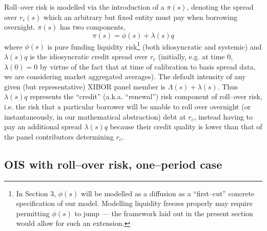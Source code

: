 \documentclass[12pt,a4paper]{article}
\theoremstyle{plain}
\numberwithin{equation}{section}
\begin{document}
Roll--over risk is modelled via the introduction of a $\pi(s)$, denoting the spread over $r_c(s)$ which an arbitrary but fixed entity must pay when borrowing overnight. $\pi(s)$ has two components,
\begin{equation}
\pi(s)=\phi(s)+\lambda(s)q
\end{equation}
where $\phi(s)$ is pure funding liquidity risk\footnote{In Section 3, $\phi(s)$ will be modelled as a diffusion as a ``first--cut'' concrete specification of our model. Modelling liquidity freezes properly may require permitting $\phi(s)$ to jump --- the framework laid out in the present section would allow for such an extension.} (both idiosyncratic and systemic) and $\lambda(s)q$ is the idiosyncratic credit spread over $r_c$ (initially, e.g. at time 0, $\lambda(0)=0$ by virtue of the fact that at time of calibration to basis spread data, we are considering market aggregated averages). The default intensity of any given (but representative) XIBOR panel member is $\Lambda(s)+\lambda(s)$. Thus $\lambda(s)q$ represents the ``credit'' (a.k.a. ``renewal'') risk component of roll--over risk, i.e. the risk that a particular borrower will be unable to roll over overnight (or instantaneously, in our mathematical abstraction) debt at $r_c$, instead having to pay an additional spread $\lambda(s)q$ because their credit quality is lower than that of the panel contributors determining $r_c$.

\subsection{OIS with roll--over risk, one--period case}
\end{document}
